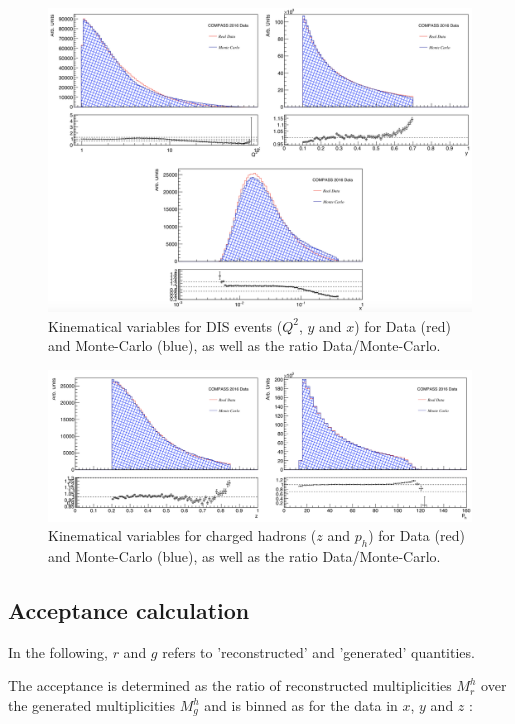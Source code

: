 \begin{figure}[!h]
	\includegraphics[scale=0.45]{./gfx/DIS_kin.png}
	\caption{Kinematical variables for DIS events ($Q^2$, $y$ and $x$) for Data (red) and Monte-Carlo (blue), as well as the ratio Data/Monte-Carlo.}
	\label{pic:MCDISkin}
\end{figure}

\begin{figure}[!h]
	\includegraphics[scale=0.45]{./gfx/SIDIS_kin.png}
	\caption{Kinematical variables for charged hadrons ($z$ and $p_h$) for Data (red) and Monte-Carlo (blue), as well as the ratio Data/Monte-Carlo.}
	\label{pic:MCSIDISkin}
\end{figure}

\subsection{Acceptance calculation}

In the following, $r$ and $g$ refers to 'reconstructed' and 'generated' quantities.

The acceptance is determined as the ratio of reconstructed multiplicities $M^h_r$ over the generated multiplicities $M^h_g$ and is binned as for the data in $x$, $y$ and $z$ :

